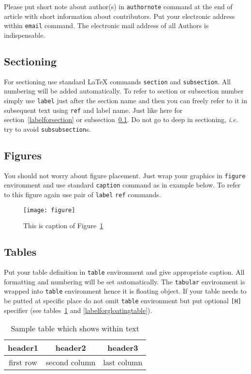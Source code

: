 \documentclass{rgg}
\begin{document}
    Please put short note about author(s)
    in \texttt{authornote} command 
    at the end of article with short information about
    contributors. Put your electronic address within
    \texttt{email} command.
    The electronic mail address of all Authors is indispensable.

  \subsection{Sectioning}
    \label{labelforsubsection}
    For sectioning use standard \LaTeX{} commands
    \texttt{section} and \texttt{subsection}.
    All numbering will be added automatically.
    To refer to section or subsection number
    simply use \texttt{label} just after the section
    name and then you can freely refer to it in subsequent text
    using \texttt{ref} and label name.
    Just like here for section~\ref{labelforsection} or
    subsection~\ref{labelforsubsection}.
    Do not go to deep in sectioning, \emph{i.e.} try to avoid
    \texttt{subsubsection}s. 

  \subsection{Figures}
    You should not worry about figure placement.
    Just wrap your graphics in \texttt{figure}
    environment and use standard \texttt{caption}
    command as in example below.
    To refer to this figure again use pair of \texttt{label}
    \texttt{ref} commands.
    \begin{figure}
      \texttt{[image: figure]}
      \caption{This is caption of Figure~\ref{figurecaption}}
      \label{figurecaption}
    \end{figure}

  \subsection{Tables}
    Put your table definition in 
    \texttt{table} environment and give appropriate caption.
    All formatting and numbering will be set automatically.
    The \texttt{tabular} environment is wrapped into 
    \texttt{table} environment hence it is floating object.
    If your table needs to be putted at specific place
    do not omit \texttt{table} environment but put
    optional \texttt{[H]} specifier
    (see tables~\ref{labelforheretable} and \ref{labelforgloatingtable}).

    \begin{table}[H]
      \caption{Sample table which shows within text}
      \label{labelforheretable}
      \begin{tabular}{ccc}
        \toprule
        header1 & header2 & header3 \\
        \midrule
        first row  & second column & last column \\
        \bottomrule
      \end{tabular}
    \end{table}
\end{document}
